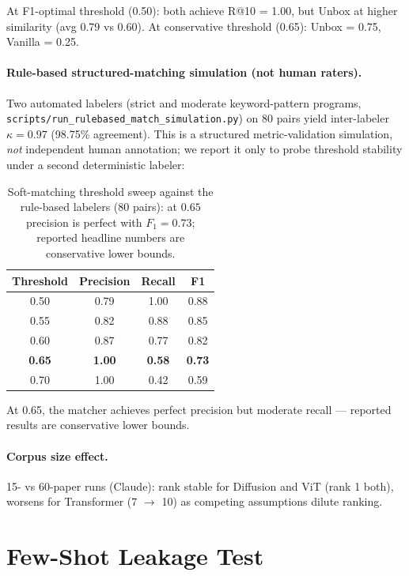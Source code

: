 \documentclass[11pt]{article}
\newcommand{\fpath}[1]{\mbox{}\nolinkurl{#1}}
\begin{document}
At F1-optimal threshold (0.50): both achieve R@10 = 1.00, but Unbox at higher similarity (avg 0.79 vs 0.60). At conservative threshold (0.65): Unbox = 0.75, Vanilla = 0.25.

\paragraph{Rule-based structured-matching simulation (not human raters).} Two automated labelers (strict and moderate keyword-pattern programs, \fpath{scripts/run_rulebased_match_simulation.py}) on 80 pairs yield inter-labeler $\kappa = 0.97$ (98.75\% agreement). This is a structured metric-validation simulation, \emph{not} independent human annotation; we report it only to probe threshold stability under a second deterministic labeler:

\begin{table}[h]
\centering
\caption{Soft-matching threshold sweep against the rule-based labelers (80 pairs): at $0.65$ precision is perfect with $F_1{=}0.73$; reported headline numbers are conservative lower bounds.}
\label{tab:threshold_sweep}
\footnotesize
\setlength{\tabcolsep}{4pt}
\begin{tabular}{cccc}
\toprule
Threshold & Precision & Recall & F1 \\
\midrule
0.50 & 0.79 & 1.00 & 0.88 \\
0.55 & 0.82 & 0.88 & 0.85 \\
0.60 & 0.87 & 0.77 & 0.82 \\
\textbf{0.65} & \textbf{1.00} & \textbf{0.58} & \textbf{0.73} \\
0.70 & 1.00 & 0.42 & 0.59 \\
\bottomrule
\end{tabular}
\end{table}

At 0.65, the matcher achieves perfect precision but moderate recall --- reported results are conservative lower bounds.

\paragraph{Corpus size effect.} 15- vs 60-paper runs (Claude): rank stable for Diffusion and ViT (rank 1 both), worsens for Transformer (7 $\rightarrow$ 10) as competing assumptions dilute ranking.

\section{Few-Shot Leakage Test}\label{sec:leakage}
\end{document}
